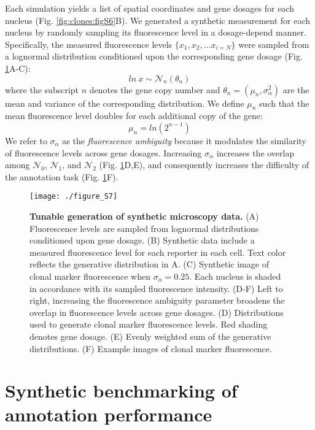 Each simulation yields a list of spatial coordinates and gene dosages for each nucleus (Fig. \ref{fig:clones:figS6}B). We generated a synthetic measurement for each nucleus by randomly sampling its fluorescence level in a dosage-depend manner. Specifically, the measured fluorescence levels $\{x_1, x_2, \ldots x_{i=N} \}$ were sampled from a lognormal distribution conditioned upon the corresponding gene dosage (Fig. \ref{fig:clones:figS7}A-C):
\begin{equation}
ln\ x \sim \mathcal{N}_n(\theta _n)
\end{equation}
where the subscript $n$ denotes the gene copy number and $\theta_n = (\mu_n,\sigma_{\alpha}^2)$ are the mean and variance of the corresponding distribution. We define $\mu_n$ such that the mean fluorescence level doubles for each additional copy of the gene:
\begin{equation}
\mu_{n } = ln(2^{n-1})
\end{equation}
We refer to $\sigma_{\alpha}$ as the \emph{fluorescence ambiguity} because it modulates the similarity of fluorescence levels across gene dosages. Increasing $\sigma_{\alpha}$ increases the overlap among $\mathcal{N}_0$, $\mathcal{N}_1$, and $\mathcal{N}_2$ (Fig. \ref{fig:clones:figS7}D,E), and consequently increases the difficulty of the annotation task (Fig. \ref{fig:clones:figS7}F).

\begin{figure}[h]
\texttt{[image: ./figure\_S7]}
\caption[Tunable generation of synthetic microscopy data.]{\textbf{Tunable generation of synthetic microscopy data.} (A) Fluorescence levels are sampled from lognormal distributions conditioned upon gene dosage. (B) Synthetic data include a measured fluorescence level for each reporter in each cell. Text color reflects the generative distribution in A. (C) Synthetic image of clonal marker fluorescence when $\sigma_{\alpha}=0.25$. Each nucleus is shaded in accordance with its sampled fluorescence intensity. (D-F) Left to right, increasing the fluorescence ambiguity parameter broadens the overlap in fluorescence levels across gene dosages. (D) Distributions used to generate clonal marker fluorescence levels. Red shading denotes gene dosage. (E) Evenly weighted sum of the generative distributions. (F) Example images of clonal marker fluorescence.}
\label{fig:clones:figS7}
\end{figure}

\section{Synthetic benchmarking of annotation performance}
\label{ch:clones:benchmarking}

